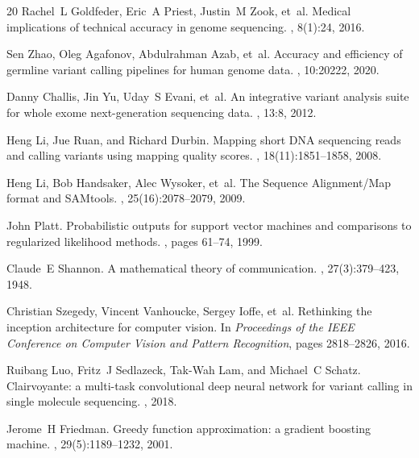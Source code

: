 \documentclass[sigconf]{acmart}
\begin{document}
\begin{thebibliography}{20}
Rachel~L Goldfeder, Eric~A Priest, Justin~M Zook, et~al.
\newblock Medical implications of technical accuracy in genome sequencing.
, 8(1):24, 2016.

Sen Zhao, Oleg Agafonov, Abdulrahman Azab, et~al.
\newblock Accuracy and efficiency of germline variant calling pipelines for human genome data.
, 10:20222, 2020.

Danny Challis, Jin Yu, Uday~S Evani, et~al.
\newblock An integrative variant analysis suite for whole exome next-generation sequencing data.
, 13:8, 2012.

Heng Li, Jue Ruan, and Richard Durbin.
\newblock Mapping short {DNA} sequencing reads and calling variants using mapping quality scores.
, 18(11):1851--1858, 2008.

Heng Li, Bob Handsaker, Alec Wysoker, et~al.
\newblock The {S}equence {A}lignment/{M}ap format and {SAM}tools.
, 25(16):2078--2079, 2009.

John Platt.
\newblock Probabilistic outputs for support vector machines and comparisons to regularized likelihood methods.
, pages 61--74, 1999.

Claude~E Shannon.
\newblock A mathematical theory of communication.
, 27(3):379--423, 1948.

Christian Szegedy, Vincent Vanhoucke, Sergey Ioffe, et~al.
\newblock Rethinking the inception architecture for computer vision.
\newblock In {\em Proceedings of the IEEE Conference on Computer Vision and Pattern Recognition}, pages 2818--2826, 2016.

Ruibang Luo, Fritz~J Sedlazeck, Tak-Wah Lam, and Michael~C Schatz.
\newblock Clairvoyante: a multi-task convolutional deep neural network for variant calling in single molecule sequencing.
, 2018.

Jerome~H Friedman.
\newblock Greedy function approximation: a gradient boosting machine.
, 29(5):1189--1232, 2001.

\end{thebibliography}
\end{document}
